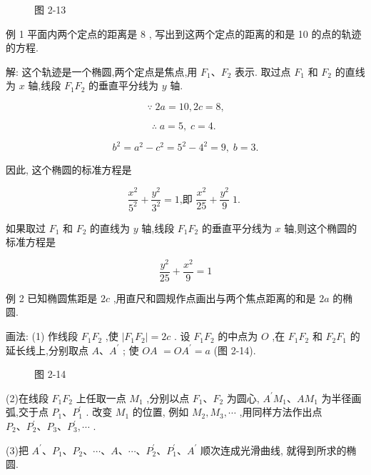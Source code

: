 \documentclass[lang=cn,newtx,12pt,scheme=chinese]{elegantbook}
\begin{document}
\begin{figure}[h]
  \centering
  
  \caption{图 2-13}
\end{figure}

例 1 平面内两个定点的距离是 8 , 写出到这两个定点的距离的和是 10 的点的轨迹的方程.

解: 这个轨迹是一个椭圆,两个定点是焦点,用 \({F}_{1}\text{、}{F}_{2}\) 表示. 取过点 \({F}_{1}\) 和 \({F}_{2}\) 的直线为 \(x\) 轴,线段 \({F}_{1}{F}_{2}\) 的垂直平分线为 \(y\) 轴.

\[
  \because \;{2a} = {10},{2c} = 8\text{,}
\]

\[
  \therefore \;a = 5,\;c = 4\text{. }
\]

\[
    {b}^{2} = {a}^{2} - {c}^{2} = {5}^{2} - {4}^{2} = 9,\;b = 3.
\]

因此, 这个椭圆的标准方程是

\[
  \frac{{x}^{2}}{{5}^{2}} + \frac{{y}^{2}}{{3}^{2}} = 1\text{,即 }\frac{{x}^{2}}{25} + \frac{{y}^{2}}{9}\;1\text{. }
\]

如果取过 \({F}_{1}\) 和 \({F}_{2}\) 的直线为 \(y\) 轴,线段 \({F}_{1}{F}_{2}\) 的垂直平分线为 \(x\) 轴,则这个椭圆的标准方程是

\[
  \frac{{y}^{2}}{25} + \frac{{x}^{2}}{9} = 1
\]

例 2 已知椭圆焦距是 \({2c}\) ,用直尺和圆规作点画出与两个焦点距离的和是 \({2a}\) 的椭圆.

画法: (1) 作线段 \({F}_{1}{F}_{2}\) ,使 \(\left| {{F}_{1}{F}_{2}}\right| = {2c}\) . 设 \({F}_{1}{F}_{2}\) 的中点为 \(O\) ,在 \({F}_{1}{F}_{2}\) 和 \({F}_{2}{F}_{1}\) 的延长线上,分别取点 \(A\text{、}{A}^{\prime }\) ; 使 \({OA}\) \(= O{A}^{\prime } = a\) (图 2-14).

\begin{figure}[h]
  \centering
  
  \caption{图 2-14}
\end{figure}

(2)在线段 \({F}_{1}{F}_{2}\) 上任取一点 \({M}_{1}\) ,分别以点 \({F}_{1}\text{、}{F}_{2}\) 为圆心, \({A}^{\prime }{M}_{1}\text{、}A{M}_{1}\) 为半径画弧,交于点 \({P}_{1}\text{、}{P}_{1}^{\prime }\) . 改变 \({M}_{1}\) 的位置, 例如 \({M}_{2},{M}_{3},\cdots\) ,用同样方法作出点 \({P}_{2}\text{、}{P}_{2}^{\prime }\text{、}{P}_{3}\text{、}{P}_{3}^{\prime },\cdots\) .

(3)把 \({A}^{\prime }\text{、}{P}_{1}\text{、}{P}_{2}\text{、}\cdots \text{、}A\text{、}\cdots \text{、}{P}_{2}^{\prime }\text{、}{P}_{1}^{\prime }\text{、}{A}^{\prime }\) 顺次连成光滑曲线, 就得到所求的椭圆.
\end{document}
